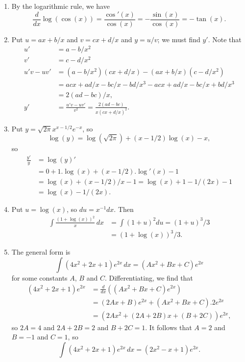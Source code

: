 \documentclass{amsart}
\renewcommand{\:}       {\colon}
\begin{document}
\begin{enumerate}
 \item %
  By the logarithmic rule, we have 
  \[ \frac{d}{dx}\log(\cos(x)) = \frac{\cos'(x)}{\cos(x)} = 
      -\frac{\sin(x)}{\cos(x)} = -\tan(x).
  \]

 \item %
  Put $u=ax+b/x$ and $v=cx+d/x$ and $y=u/v$; we must find $y'$.  Note
  that
  \begin{align*}
   u' &= a-b/x^2 \\
   v' &= c-d/x^2 \\
   u'v - uv' &= (a-b/x^2)(cx+d/x) - (ax+b/x)(c-d/x^2) \\
             &= acx + ad/x -bc/x -bd/x^3 
                -acx + ad/x -bc/x + bd/x^3 \\
             &= 2(ad-bc)/x, \\
   y' &= \frac{u'v-uv'}{v^2} = \frac{2(ad-bc)}{x(cx+d/x)^2}.
  \end{align*}

 \item %
  Put $y=\sqrt{2\pi}x^{x-1/2}e^{-x}$, so 
  \[ \log(y) = \log(\sqrt{2\pi}) + (x-1/2)\log(x) - x, \]
  so
  \begin{align*}
   \frac{y'}{y} &= \log(y)' \\
    &= 0 + 1.\log(x) + (x-1/2).\log'(x) - 1 \\
    &= \log(x) + (x-1/2)/x - 1 = \log(x) + 1 - 1/(2x) - 1 \\
    &= \log(x) - 1/(2x).  
  \end{align*}

 \item %
  Put $u=\log(x)$, so $du=x^{-1}dx$.  Then
  \begin{align*}
   \int\frac{(1+\log(x))^2}{x} \,dx &=
    \int (1+u)^2 du = (1+u)^3/3 \\
    &= (1+\log(x))^3/3.
  \end{align*}

 \item %
  The general form is
  \[ \int (4x^2+2x+1)e^{2x}\,dx = (Ax^2+Bx+C)e^{2x} \]
  for some constants $A$, $B$ and $C$.  Differentiating, we find that 
  \begin{align*}
   (4x^2+2x+1)e^{2x} &= \frac{d}{dx}((Ax^2+Bx+C)e^{2x}) \\
     &= (2Ax+B)e^{2x} + (Ax^2+Bx+C).2e^{2x} \\
     &= (2Ax^2+(2A+2B)x+(B+2C))e^{2x},
  \end{align*}
  so $2A=4$ and $2A+2B=2$ and $B+2C=1$.  It follows that $A=2$ and
  $B=-1$ and $C=1$, so
  \[  \int (4x^2+2x+1)e^{2x}\,dx = (2x^2-x+1)e^{2x}. \]


\end{enumerate}
\end{document}
